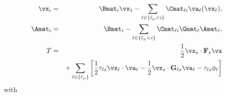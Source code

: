 \begin{eqnarray}
\vx_{i} &=& \Bmat_i \vx_1 - \sum_{\ell \in \{\ell_\mu<i\}} \Cmat_{\ell i} \va_\ell(\vx_\ell), \\
\Amat_{i} &=& \Bmat_i - \sum_{\ell \in \{\ell_\mu<i\}} \Cmat_{\ell i} \Gmat_\ell \Amat_\ell, \\
T &=& \frac{1}{2} \vx_s \cdot \mathbf{F}_s \vx \nonumber \\
&&+ \sum\limits_{\ell \in \{\ell_\mu\}}\left[\frac{1}{2}\tau_{\ell s} \vx_\ell \cdot \va_\ell -\frac{1}{2}\vx_s \cdot \mathbf{G}_{\ell s}\va_\ell -\tau_{\ell s}\phi_\ell \right]
\end{eqnarray}
\normalsize
with